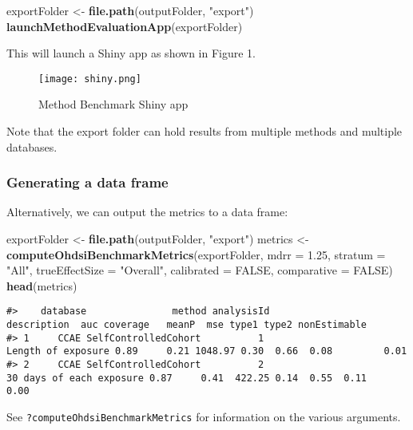 \documentclass[]{article}
\newenvironment{Shaded}{\begin{snugshade}}{\end{snugshade}}
\newcommand{\DataTypeTok}[1]{\textcolor[rgb]{0.13,0.29,0.53}{#1}}
\newcommand{\FloatTok}[1]{\textcolor[rgb]{0.00,0.00,0.81}{#1}}
\newcommand{\KeywordTok}[1]{\textcolor[rgb]{0.13,0.29,0.53}{\textbf{#1}}}
\newcommand{\NormalTok}[1]{#1}
\newcommand{\OtherTok}[1]{\textcolor[rgb]{0.56,0.35,0.01}{#1}}
\newcommand{\StringTok}[1]{\textcolor[rgb]{0.31,0.60,0.02}{#1}}
\begin{document}
\begin{Shaded}
\begin{Highlighting}[]
\NormalTok{exportFolder <-}\StringTok{ }\KeywordTok{file.path}\NormalTok{(outputFolder, }\StringTok{"export"}\NormalTok{)}
\KeywordTok{launchMethodEvaluationApp}\NormalTok{(exportFolder)}
\end{Highlighting}
\end{Shaded}

This will launch a Shiny app as shown in Figure 1.

\begin{figure}
\centering
\texttt{[image: shiny.png]}
\caption{Method Benchmark Shiny app}
\end{figure}

Note that the export folder can hold results from multiple methods and
multiple databases.

\hypertarget{generating-a-data-frame}{%
\subsubsection{Generating a data frame}\label{generating-a-data-frame}}

Alternatively, we can output the metrics to a data frame:

\begin{Shaded}
\begin{Highlighting}[]
\NormalTok{exportFolder <-}\StringTok{ }\KeywordTok{file.path}\NormalTok{(outputFolder, }\StringTok{"export"}\NormalTok{)}
\NormalTok{metrics <-}\StringTok{ }\KeywordTok{computeOhdsiBenchmarkMetrics}\NormalTok{(exportFolder, }
                                        \DataTypeTok{mdrr =} \FloatTok{1.25}\NormalTok{, }
                                        \DataTypeTok{stratum =} \StringTok{"All"}\NormalTok{, }
                                        \DataTypeTok{trueEffectSize =} \StringTok{"Overall"}\NormalTok{, }
                                        \DataTypeTok{calibrated =} \OtherTok{FALSE}\NormalTok{, }
                                        \DataTypeTok{comparative =} \OtherTok{FALSE}\NormalTok{)}
\KeywordTok{head}\NormalTok{(metrics)}
\end{Highlighting}
\end{Shaded}

\begin{verbatim}
#>    database               method analysisId                                           description  auc coverage   meanP  mse type1 type2 nonEstimable
#> 1     CCAE SelfControlledCohort          1                    Length of exposure 0.89     0.21 1048.97 0.30  0.66  0.08         0.01
#> 2     CCAE SelfControlledCohort          2                        30 days of each exposure 0.87     0.41  422.25 0.14  0.55  0.11         0.00
\end{verbatim}

See \texttt{?computeOhdsiBenchmarkMetrics} for information on the
various arguments.
\end{document}
